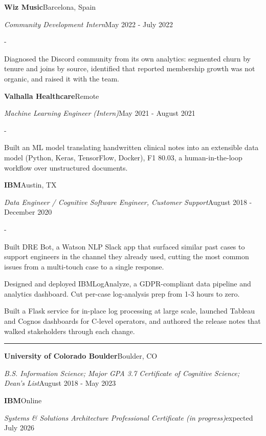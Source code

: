 \documentclass[10pt,letterpaper]{article}
\newenvironment{cvitems}{%
  \begin{list}{-}{%
    \setlength{\leftmargin}{12pt}%
    \setlength{\itemsep}{1.2pt}%
    \setlength{\parsep}{0pt}%
    \setlength{\topsep}{1.5pt}%
    \setlength{\partopsep}{0pt}%
    \setlength{\labelwidth}{6pt}%
    \setlength{\labelsep}{6pt}%
    \setlength{\itemindent}{0pt}%
  }%
}{\end{list}}
\newcommand{\cvsection}[1]{%
  \vspace{7pt}%
  \noindent{\bfseries\fontsize{11pt}{13pt}\selectfont\MakeUppercase{#1}}\par
  \vspace{1pt}%
  \noindent\rule{\textwidth}{0.4pt}\par
  \vspace{4pt}%
}
\newcommand{\cventryhead}[4]{%
  \noindent\textbf{#1}\hfill#2\par
  \vspace{0.5pt}%
  \noindent\textit{#3}\hfill#4\par
}
\newcommand{\cveduhead}[4]{%
  \noindent\textbf{#1}\hfill#2\par
  \vspace{0.5pt}%
  \noindent\textit{#3}\hfill#4\par
}
\begin{document}
\vspace{3pt}
\cventryhead{Wiz Music}{Barcelona, Spain}
{Community Development Intern}{May 2022 - July 2022}
\begin{cvitems}
  \item Diagnosed the Discord community from its own analytics: segmented churn by tenure and joins by source, identified that reported membership growth was not organic, and raised it with the team.
\end{cvitems}

\vspace{3pt}
\cventryhead{Valhalla Healthcare}{Remote}
{Machine Learning Engineer (Intern)}{May 2021 - August 2021}
\begin{cvitems}
  \item Built an ML model translating handwritten clinical notes into an extensible data model (Python, Keras, TensorFlow, Docker), F1 80.03, a human-in-the-loop workflow over unstructured documents.
\end{cvitems}

\vspace{3pt}
\cventryhead{IBM}{Austin, TX}
{Data Engineer / Cognitive Software Engineer, Customer Support}{August 2018 - December 2020}
\begin{cvitems}
  \item Built DRE Bot, a Watson NLP Slack app that surfaced similar past cases to support engineers in the channel they already used, cutting the most common issues from a multi-touch case to a single response.
  \item Designed and deployed IBMLogAnalyze, a GDPR-compliant data pipeline and analytics dashboard. Cut per-case log-analysis prep from 1-3 hours to zero.
  \item Built a Flask service for in-place log processing at large scale, launched Tableau and Cognos dashboards for C-level operators, and authored the release notes that walked stakeholders through each change.
\end{cvitems}

\cvsection{Education}

\cveduhead{University of Colorado Boulder}{Boulder, CO}
{B.S. Information Science; Major GPA 3.7 \textbar{} Certificate of Cognitive Science; Dean's List}{August 2018 - May 2023}

\vspace{3pt}
\cveduhead{IBM}{Online}
{Systems \& Solutions Architecture Professional Certificate (in progress)}{expected July 2026}
\end{document}

